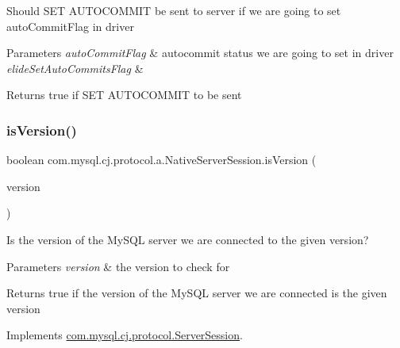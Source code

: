 Should S\+ET A\+U\+T\+O\+C\+O\+M\+M\+IT be sent to server if we are going to set auto\+Commit\+Flag in driver


\begin{DoxyParams}{Parameters}
{\em auto\+Commit\+Flag} & autocommit status we are going to set in driver \\
\hline
{\em elide\+Set\+Auto\+Commits\+Flag} & \\
\hline
\end{DoxyParams}
\begin{DoxyReturn}{Returns}
true if S\+ET A\+U\+T\+O\+C\+O\+M\+M\+IT to be sent 
\end{DoxyReturn}
\mbox{\label{classcom_1_1mysql_1_1cj_1_1protocol_1_1a_1_1_native_server_session_a07301eeaa6402981ce961f528b4e09ef}} 
\subsubsection{\texorpdfstring{is\+Version()}{isVersion()}}
{\footnotesize\ttfamily boolean com.\+mysql.\+cj.\+protocol.\+a.\+Native\+Server\+Session.\+is\+Version (\begin{DoxyParamCaption}\item[{\mbox{\hyperlink{classcom_1_1mysql_1_1cj_1_1_server_version}{Server\+Version}}}]{version }\end{DoxyParamCaption})}

Is the version of the My\+S\+QL server we are connected to the given version?


\begin{DoxyParams}{Parameters}
{\em version} & the version to check for\\
\hline
\end{DoxyParams}
\begin{DoxyReturn}{Returns}
true if the version of the My\+S\+QL server we are connected is the given version 
\end{DoxyReturn}


Implements \mbox{\hyperlink{interfacecom_1_1mysql_1_1cj_1_1protocol_1_1_server_session_a021c8f114fce23443b9a8b26074b137a}{com.\+mysql.\+cj.\+protocol.\+Server\+Session}}.

